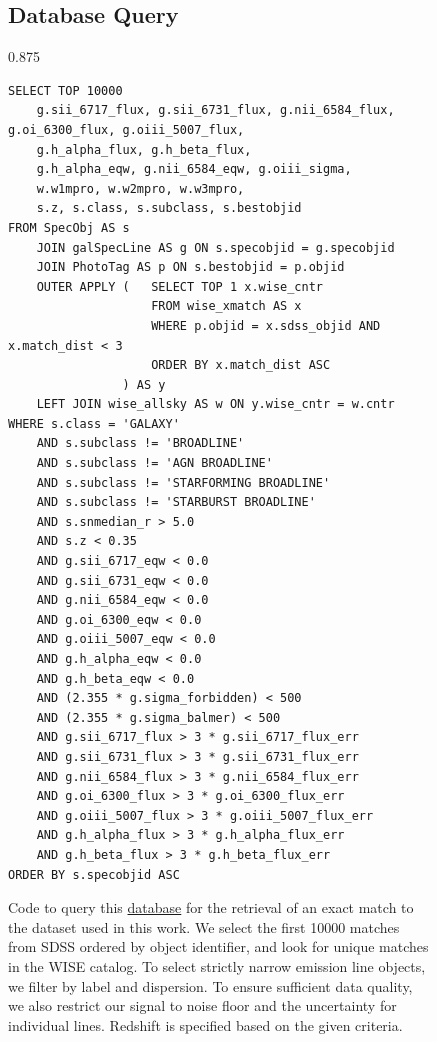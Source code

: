 	\begin{figure}[t]

	\vspace{\baselineskip}
	\subsection{Database Query}
	\vspace{0.25\baselineskip}

	\begin{center}
		\begin{varwidth}{0.875\textwidth}
			\begin{lstlisting}
SELECT TOP 10000
    g.sii_6717_flux, g.sii_6731_flux, g.nii_6584_flux, g.oi_6300_flux, g.oiii_5007_flux,
    g.h_alpha_flux, g.h_beta_flux,
    g.h_alpha_eqw, g.nii_6584_eqw, g.oiii_sigma,
    w.w1mpro, w.w2mpro, w.w3mpro,
    s.z, s.class, s.subclass, s.bestobjid
FROM SpecObj AS s
    JOIN galSpecLine AS g ON s.specobjid = g.specobjid
    JOIN PhotoTag AS p ON s.bestobjid = p.objid
    OUTER APPLY (   SELECT TOP 1 x.wise_cntr
                    FROM wise_xmatch AS x
                    WHERE p.objid = x.sdss_objid AND x.match_dist < 3 
                    ORDER BY x.match_dist ASC
                ) AS y
    LEFT JOIN wise_allsky AS w ON y.wise_cntr = w.cntr
WHERE s.class = 'GALAXY'
    AND s.subclass != 'BROADLINE'
    AND s.subclass != 'AGN BROADLINE'
    AND s.subclass != 'STARFORMING BROADLINE'
    AND s.subclass != 'STARBURST BROADLINE'
    AND s.snmedian_r > 5.0
    AND s.z < 0.35
    AND g.sii_6717_eqw < 0.0
    AND g.sii_6731_eqw < 0.0
    AND g.nii_6584_eqw < 0.0
    AND g.oi_6300_eqw < 0.0
    AND g.oiii_5007_eqw < 0.0 
    AND g.h_alpha_eqw < 0.0
    AND g.h_beta_eqw < 0.0
    AND (2.355 * g.sigma_forbidden) < 500 
    AND (2.355 * g.sigma_balmer) < 500 
    AND g.sii_6717_flux > 3 * g.sii_6717_flux_err
    AND g.sii_6731_flux > 3 * g.sii_6731_flux_err
    AND g.nii_6584_flux > 3 * g.nii_6584_flux_err
    AND g.oi_6300_flux > 3 * g.oi_6300_flux_err
    AND g.oiii_5007_flux > 3 * g.oiii_5007_flux_err
    AND g.h_alpha_flux > 3 * g.h_alpha_flux_err
    AND g.h_beta_flux > 3 * g.h_beta_flux_err
ORDER BY s.specobjid ASC\end{lstlisting}
			\end{varwidth}
		\end{center}
		\caption{Code to query this \href{https://skyserver.sdss.org/dr19/SearchTools/sql}{database} for the retrieval of an exact match to the
				 dataset used in this work. We select the first \num{10000} matches from SDSS ordered by object identifier, and look for unique
				 matches in the WISE catalog. To select strictly narrow emission line objects, we filter by label and dispersion. To ensure
				 sufficient data quality, we also restrict our signal to noise floor and the uncertainty for individual lines. Redshift is
				 specified based on the given criteria.}
		\label{fig:query}
	\end{figure}



